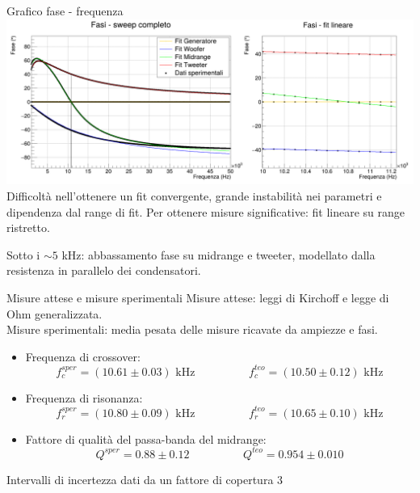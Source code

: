 \documentclass[italian]{beamer}
\begin{document}
\begin{frame}{Grafico fase - frequenza}
    \includegraphics[width=\textwidth]{fig_fase.png}
    Difficoltà nell'ottenere un fit convergente, grande instabilità nei parametri e dipendenza dal range di fit.
    Per ottenere misure significative: fit lineare su range ristretto.

    Sotto i $\sim 5$ kHz: abbassamento fase su midrange e tweeter, modellato dalla resistenza in parallelo dei condensatori.
\end{frame}

\begin{frame}{Misure attese e misure sperimentali}
    Misure attese: leggi di Kirchoff e legge di Ohm generalizzata.\\
    Misure sperimentali: media pesata delle misure ricavate da ampiezze e fasi.

    \begin{itemize}
        \item Frequenza di crossover:
              \begin{equation*}
                  f_{c}^{sper} = (10.61 \pm 0.03) \text{ kHz} \hspace{2cm} f_{c}^{teo} = (10.50
                  \pm 0.12) \text{ kHz}
              \end{equation*}
        \item Frequenza di risonanza:
              \begin{equation*}
                  f_{r}^{sper} = (10.80 \pm 0.09) \text{ kHz} \hspace{2cm} f_{r}^{teo} = (10.65
                  \pm 0.10) \text{ kHz}
              \end{equation*}
        \item Fattore di qualità del passa-banda del midrange:
              \begin{equation*}
                  Q^{sper} = 0.88 \pm 0.12  \hspace{2cm}  Q^{teo} = 0.954 \pm 0.010
              \end{equation*}
    \end{itemize}
    Intervalli di incertezza dati da un fattore di copertura $3$
\end{frame}
\end{document}
